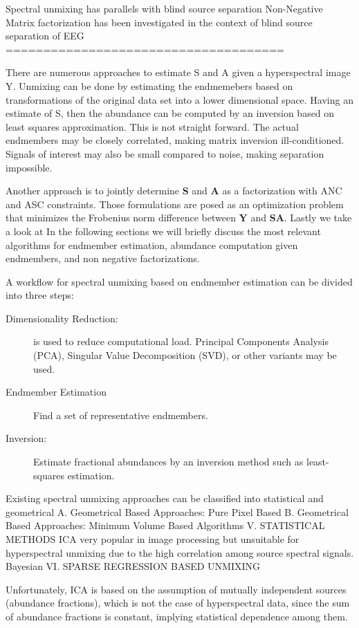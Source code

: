 Spectral unmixing has parallels with blind source separation
Non-Negative Matrix factorization has been investigated in the context of blind source separation of EEG\\
=====================================

There are numerous approaches to estimate S and A given a hyperspectral image Y.  Unmixing can be done by estimating the endmemebers based on transformations of the original data set into a lower dimensional space.  Having an estimate of S, then the abundance can be computed by an inversion based on least squares approximation.  This is not straight forward.  The actual endmembers may be closely correlated, making matrix inversion ill-conditioned.  Signals of interest may also be small compared to noise, making separation impossible.  

Another approach is to jointly determine \textbf{S} and \textbf{A} as a factorization with ANC and ASC constraints.  Those formulations are posed as an optimization problem that minimizes the Frobenius norm difference between \textbf{Y} and \textbf{SA}.  Lastly we take a look at In the following sections we will briefly discuss the most relevant algorithms for endmember estimation, abundance computation given endmembers, and non negative factorizations.

A workflow for spectral unmixing based on endmember estimation can be divided into three steps:
\begin{description}
	\item[Dimensionality Reduction:] is used to reduce computational load.  Principal Components Analysis (PCA), Singular Value Decomposition (SVD), or other variants may be used.
	\item[Endmember Estimation] Find a set of representative endmembers.
	\item[Inversion:] Estimate fractional abundances by an inversion method such as least-squares estimation.
\end{description}

Existing spectral unmixing approaches can be classified into statistical and geometrical
A. Geometrical Based Approaches: Pure Pixel Based
B. Geometrical Based Approaches: Minimum Volume Based Algorithms
V. STATISTICAL METHODS
	ICA very popular in image processing but unsuitable for hyperspectral unmixing due to the high correlation among source spectral signals.
	Bayesian
VI. SPARSE REGRESSION BASED UNMIXING

Unfortunately, ICA is based on the
assumption of mutually independent sources (abundance fractions),
which is not the case of hyperspectral data, since the sum
of abundance fractions is constant, implying statistical dependence
among them.


